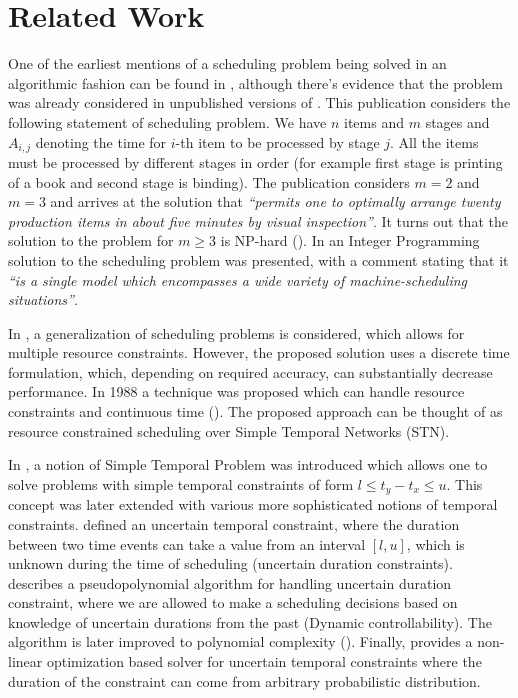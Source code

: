 \section{Related Work}
One of the earliest mentions of a scheduling problem being solved in an algorithmic fashion can be found in \cite{johnson1954optimal}, although there's evidence that the problem was already considered in unpublished versions of \cite{bellman1956mathematical}. This publication considers the following statement of scheduling problem. We have $n$ items and $m$ stages and $A_{i,j}$ denoting the time for $i$-th item to be processed by stage $j$. All the items must be processed by different stages in order (for example first stage is printing of a book and second stage is binding). The publication considers $m=2$ and $m=3$ and arrives at the solution that \textit{``permits one to optimally arrange twenty production items in about five minutes by visual inspection''}. It turns out that the solution to the problem for $m \geq 3$ is NP-hard (\cite{garey1976complexity}). In \cite{wagner1959integer} an Integer Programming solution to the scheduling problem was presented, with a comment stating that it \textit{``is a single model which encompasses a wide variety of machine-scheduling situations''}.

In \cite{pritsker1969multiproject}, a generalization of scheduling problems is considered, which allows for multiple resource constraints. However, the proposed solution uses a discrete time formulation, which, depending on required accuracy, can substantially decrease performance. In 1988 a technique was proposed which can handle resource constraints and continuous time (\cite{bartusch1988scheduling}). The proposed approach can be thought of as resource constrained scheduling over Simple Temporal Networks (STN).

In \cite{dechter1991temporal}, a notion of Simple Temporal Problem was introduced which allows one to solve problems with simple temporal constraints of form $l \leq t_y - t_x \leq u$. This concept was later extended with various more sophisticated notions of temporal constraints. \cite{vidal1996dealing} defined an uncertain temporal constraint, where the duration between two time events can take a value from an interval $[l,u]$, which is unknown during the time of scheduling (uncertain duration constraints). \cite{morris2001dynamic} describes a pseudopolynomial algorithm for handling uncertain duration constraint, where we are allowed to make a scheduling decisions based on knowledge of uncertain durations from the past (Dynamic controllability). The algorithm is later improved to polynomial complexity (\cite{morris2005temporal}). Finally, \cite{Fang2014} provides a non-linear optimization based solver for uncertain temporal constraints where the duration of the constraint can come from arbitrary probabilistic distribution.
